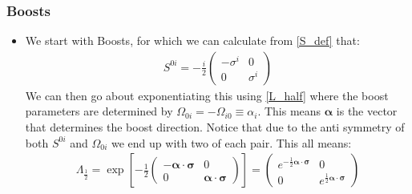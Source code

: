 \documentclass[11pt]{article}
\numberwithin{equation}{section}
\begin{document}
  \subsubsection{Boosts}
  \begin{itemize}
     \item We start with Boosts, for which we can calculate from \ref{S_def} that:
     \begin{align*}
       S^{0i} = -\frac{i}{2}\begin{pmatrix}
        -\sigma^{i} & 0 \\
        0 & \sigma^{i} 
       \end{pmatrix}
     \end{align*}
     We can then go about exponentiating this using \ref{L_half} where the boost parameters are determined by $\Omega_{0i} = -\Omega_{i0} \equiv \alpha_{i} $. This means $\boldsymbol{\alpha}$ is the vector that determines the boost direction. Notice that due to the anti symmetry of both $S^{0i}$ and $\Omega_{0i}$ we end up with two of each pair. This all means:
    \begin{align}
    \label{L_boost}
      \Lambda_{\frac{1}{2}} = \exp \left[ -\frac{1}{2}\begin{pmatrix}
        -\boldsymbol{\alpha}\cdot \boldsymbol{\sigma} & 0 \\
        0 & \boldsymbol{\alpha} \cdot \boldsymbol{\sigma}
      \end{pmatrix}\right] = \begin{pmatrix}
        e^{-\frac{1}{2}\boldsymbol{\alpha}\cdot \boldsymbol{\sigma}} & 0 \\
        0 & e^{\frac{1}{2}\boldsymbol{\alpha}\cdot \boldsymbol{\sigma}}
      \end{pmatrix}
    \end{align}
   \end{itemize} 
\end{document}
